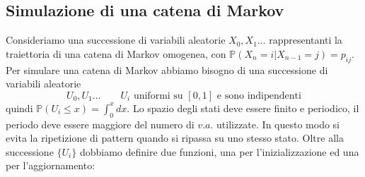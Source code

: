 \documentclass{article}
\theoremstyle{definition}
\theoremstyle{definition}
\theoremstyle{remark}
\begin{document}
\subsection{Simulazione di una catena di Markov}
Consideriamo una successione di variabili aleatorie $X_0,X_1\dots$ rappresentanti la traiettoria di una catena di Markov omogenea, con $\mathbb{P}(X_n = i| X_{n-1}= j) = p_{ij}$.
Per simulare una catena di Markov abbiamo bisogno di una successione di variabili aleatorie
$$U_0,U_1\dots\qquad  \text{$U_i$ uniformi su $[0,1]$ e sono indipendenti}$$
quindi $\mathbb{P}(U_i\le x) = \int_0^x dx$. Lo spazio degli stati deve essere finito e periodico,
il periodo deve essere maggiore del numero di $v.a.$ utilizzate. In questo modo si evita la ripetizione di pattern quando
si ripassa su uno stesso stato. Oltre alla successione $\{U_i\}$ dobbiamo definire due funzioni, una per l'inizializzazione
ed una per l'aggiornamento:
\end{document}
